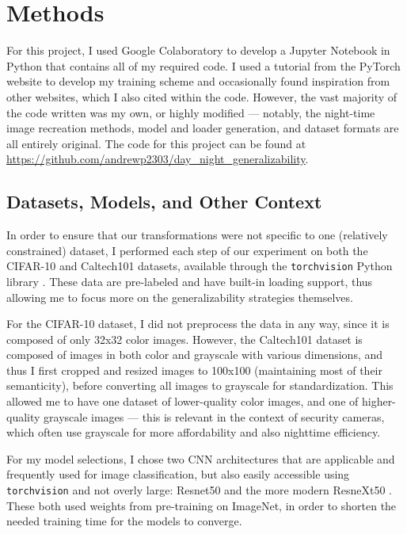 \documentclass{article}
\begin{document}
\section{Methods}
For this project, I used Google Colaboratory to develop a Jupyter Notebook in Python that contains all of my required code. I used a tutorial from the PyTorch website to develop my training scheme and occasionally found inspiration from other websites, which I also cited within the code. However, the vast majority of the code written was my own, or highly modified --- notably, the night-time image recreation methods, model and loader generation, and dataset formats are all entirely original. The code for this project can be found at \underline{\href{https://github.com/andrewp2303/day_night_generalizability}{https://github.com/andrewp2303/day\_night\_generalizability}}.
\subsection{Datasets, Models, and Other Context}
In order to ensure that our transformations were not specific to one (relatively constrained) dataset, I performed each step of our experiment on both the CIFAR-10 and Caltech101 datasets, available through the \texttt{torchvision} Python library \cite{cifar10, caltech101}. These data are pre-labeled and have built-in loading support, thus allowing me to focus more on the generalizability strategies themselves.


For the CIFAR-10 dataset, I did not preprocess the data in any way, since it is composed of only 32x32 color images. However, the Caltech101 dataset is composed of images in both color and grayscale with various dimensions, and thus I first cropped and resized images to 100x100 (maintaining most of their semanticity), before converting all images to grayscale for standardization. This allowed me to have one dataset of lower-quality color images, and one of higher-quality grayscale images --- this is relevant in the context of security cameras, which often use grayscale for more affordability and also nighttime efficiency. 

For my model selections, I chose two CNN architectures that are applicable and frequently used for image classification, but also easily accessible using \texttt{torchvision} and not overly large: Resnet50 and the more modern ResneXt50 \cite{resnet50, resnext50}. These both used weights from pre-training on ImageNet, in order to shorten the needed training time for the models to converge.
\end{document}
